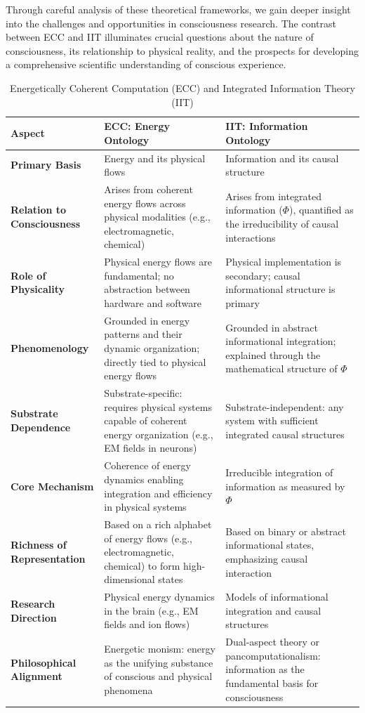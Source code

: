 \begin{refsection}
Through careful analysis of these theoretical frameworks, we gain deeper insight into the challenges and opportunities in consciousness research. The contrast between ECC and IIT illuminates crucial questions about the nature of consciousness, its relationship to physical reality, and the prospects for developing a comprehensive scientific understanding of conscious experience.

\begin{table}[h!]
\centering
\setlength{\extrarowheight}{2pt} %
\begin{tabularx}{\textwidth}{@{}p{3cm}Xp{4cm}@{}}
\toprule
\textbf{Aspect} & \textbf{ECC: Energy Ontology} & \textbf{IIT: Information Ontology} \\ \midrule
\textbf{Primary Basis} & Energy and its physical flows & Information and its causal structure \\
\textbf{Relation to Consciousness} & Arises from coherent energy flows across physical modalities (e.g., electromagnetic, chemical) & Arises from integrated information ($\Phi$), quantified as the irreducibility of causal interactions \\
\textbf{Role of Physicality} & Physical energy flows are fundamental; no abstraction between hardware and software & Physical implementation is secondary; causal informational structure is primary \\
\textbf{Phenomenology} & Grounded in energy patterns and their dynamic organization; directly tied to physical energy flows & Grounded in abstract informational integration; explained through the mathematical structure of $\Phi$ \\
\textbf{Substrate Dependence} & Substrate-specific: requires physical systems capable of coherent energy organization (e.g., EM fields in neurons) & Substrate-independent: any system with sufficient integrated causal structures \\
\textbf{Core Mechanism} & Coherence of energy dynamics enabling integration and efficiency in physical systems & Irreducible integration of information as measured by $\Phi$ \\
\textbf{Richness of Representation} & Based on a rich alphabet of energy flows (e.g., electromagnetic, chemical) to form high-dimensional states & Based on binary or abstract informational states, emphasizing causal interaction \\
\textbf{Research Direction} & Physical energy dynamics in the brain (e.g., EM fields and ion flows) & Models of informational integration and causal structures \\
\textbf{Philosophical Alignment} & Energetic monism: energy as the unifying substance of conscious and physical phenomena & Dual-aspect theory or pancomputationalism: information as the fundamental basis for consciousness \\ \bottomrule
\end{tabularx}
\caption{Energetically Coherent Computation (ECC) and Integrated Information Theory (IIT)}
\label{tab:ecc_vs_iit}
\end{table}


\end{refsection}

